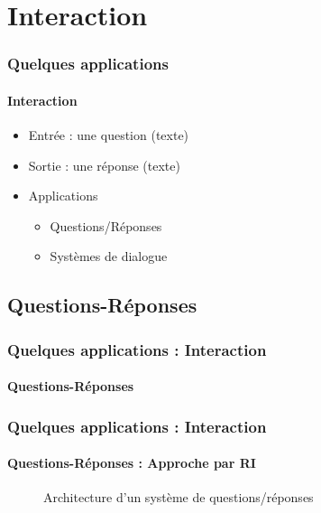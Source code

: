 \documentclass[xcolor=table]{beamer}
\begin{document}
\section{Interaction}

\begin{frame}
	\frametitle{Quelques applications}
	\framesubtitle{Interaction}
	\begin{itemize}
		\item Entrée : une question (texte)
		\item Sortie : une réponse (texte)
		\item Applications 
		\begin{itemize}
			\item Questions/Réponses
			\item Systèmes de dialogue
		\end{itemize}
	\end{itemize}
\end{frame}

\subsection{Questions-Réponses}

\begin{frame}
	\frametitle{Quelques applications : Interaction}
	\framesubtitle{Questions-Réponses}
\end{frame}

\begin{frame}
	\frametitle{Quelques applications : Interaction}
	\framesubtitle{Questions-Réponses : Approche par RI}
	
	\begin{figure}
		\caption{Architecture d'un système de questions/réponses \cite{2019-jurafsky-martin}}
	\end{figure}
	
\end{frame}
\end{document}
